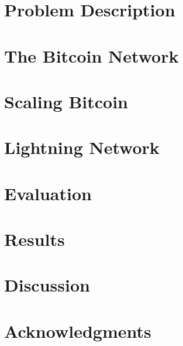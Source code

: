 \section{Problem Description}
    \label{sec:problem}
    

\clearpage
   \label{sec:macroeconomics}
   
   
\clearpage
\section{The Bitcoin Network}
    \label{sec:bitcoin}
    
\clearpage
\section{Scaling Bitcoin}
    \label{sec:results}
%    
\clearpage
\section{Lightning Network}
    \label{sec:lightning:network}
    
\clearpage
\section{Evaluation}
\clearpage
\section{Results}
\clearpage
\section{Discussion}
    \label{sec:discussion}
\clearpage
\section{Acknowledgments}
    \label{sec:acknowledgments}
